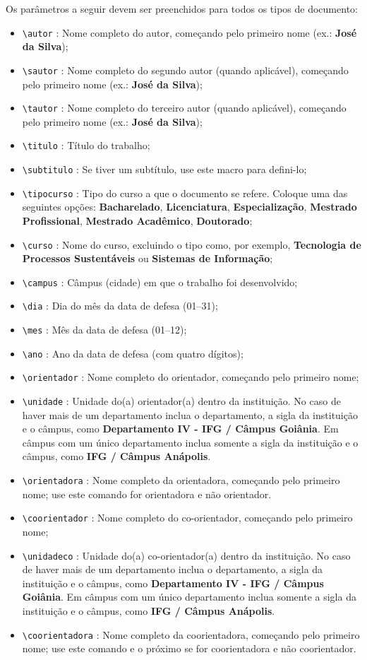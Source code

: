 Os parâmetros a seguir devem ser preenchidos para todos os tipos de documento:

 \begin{itemize}
\item \verb|\autor| : Nome completo do autor, começando pelo primeiro nome (ex.: \textbf{José da Silva});
\item \verb|\sautor| : Nome completo do segundo autor (quando aplicável), começando pelo primeiro nome (ex.:\textbf{ José da Silva});
\item \verb|\tautor| : Nome completo do terceiro autor (quando aplicável), começando pelo primeiro nome (ex.: \textbf{José da Silva});
\item \verb|\titulo| : Título do trabalho;
\item \verb|\subtitulo| : Se tiver um subtítulo, use este macro para defini-lo;
\item \verb|\tipocurso| : Tipo do curso a que o documento se refere. Coloque uma das seguintes opções: \textbf{Bacharelado}, \textbf{Licenciatura}, \textbf{Especialização}, \textbf{Mestrado Profissional}, \textbf{Mestrado Acadêmico}, \textbf{Doutorado};
\item \verb|\curso| : Nome do curso, excluindo o tipo como, por exemplo, \textbf{Tecnologia de Processos Sustentáveis} ou \textbf{Sistemas de Informação}; 
\item \verb|\campus| : Câmpus (cidade) em que o trabalho foi desenvolvido;
\item \verb|\dia| : Dia do mês da data de defesa (01--31);
\item \verb|\mes| : Mês da data de defesa (01--12);
\item \verb|\ano| : Ano da data de defesa (com quatro dígitos);
\item \verb|\orientador| : Nome completo do orientador, começando pelo primeiro nome;
\item \verb|\unidade| : Unidade do(a) orientador(a) dentro da instituição. No caso de haver mais de um departamento inclua o departamento, a sigla da instituição e o câmpus, como \textbf{Departamento IV - IFG / Câmpus Goiânia}. Em câmpus com um único departamento inclua somente a sigla da instituição e o câmpus, como \textbf{IFG / Câmpus Anápolis}.
\item \verb|\orientadora| : Nome completo da orientadora, começando pelo primeiro nome; use este comando for orientadora e não orientador.
\item \verb|\coorientador| : Nome completo do co-orientador, começando pelo primeiro nome;
\item \verb|\unidadeco| : Unidade do(a) co-orientador(a) dentro da instituição. No caso de haver mais de um departamento inclua o departamento, a sigla da instituição e o câmpus, como \textbf{Departamento IV - IFG / Câmpus Goiânia}. Em câmpus com um único departamento inclua somente a sigla da instituição e o câmpus, como \textbf{IFG / Câmpus Anápolis}.
\item \verb|\coorientadora| : Nome completo da coorientadora, começando pelo primeiro nome; use este comando e o próximo se for coorientadora e não coorientador.
\end{itemize}

